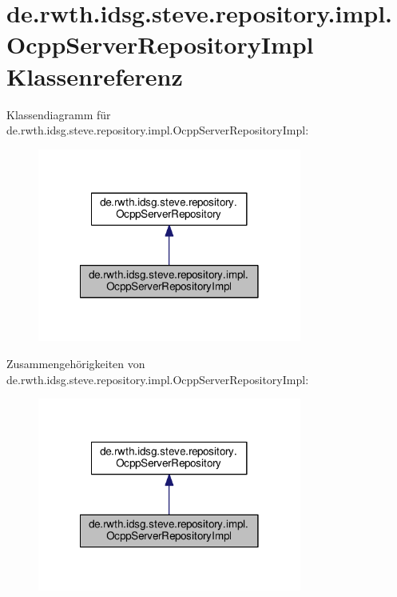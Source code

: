 \hypertarget{classde_1_1rwth_1_1idsg_1_1steve_1_1repository_1_1impl_1_1_ocpp_server_repository_impl}{\section{de.\-rwth.\-idsg.\-steve.\-repository.\-impl.\-Ocpp\-Server\-Repository\-Impl Klassenreferenz}
\label{classde_1_1rwth_1_1idsg_1_1steve_1_1repository_1_1impl_1_1_ocpp_server_repository_impl}
}


Klassendiagramm für de.\-rwth.\-idsg.\-steve.\-repository.\-impl.\-Ocpp\-Server\-Repository\-Impl\-:\nopagebreak
\begin{figure}[H]
\begin{center}
\leavevmode
\includegraphics[width=246pt]{classde_1_1rwth_1_1idsg_1_1steve_1_1repository_1_1impl_1_1_ocpp_server_repository_impl__inherit__graph}
\end{center}
\end{figure}


Zusammengehörigkeiten von de.\-rwth.\-idsg.\-steve.\-repository.\-impl.\-Ocpp\-Server\-Repository\-Impl\-:\nopagebreak
\begin{figure}[H]
\begin{center}
\leavevmode
\includegraphics[width=246pt]{classde_1_1rwth_1_1idsg_1_1steve_1_1repository_1_1impl_1_1_ocpp_server_repository_impl__coll__graph}
\end{center}
\end{figure}
